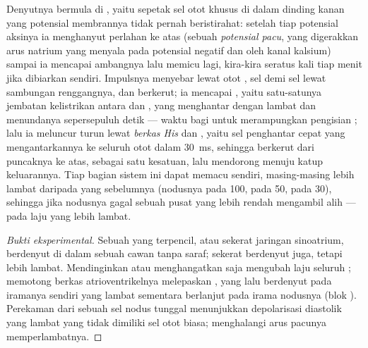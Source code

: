 \begin{proposition}\label{prop:b2:heart:conduction}
Denyutnya bermula di \emph{}, yaitu sepetak sel otot
khusus di dalam dinding  kanan yang potensial membrannya tidak
pernah beristirahat: setelah tiap potensial aksinya ia menghanyut
perlahan ke atas (sebuah \emph{potensial pacu}, yang digerakkan arus
natrium yang menyala pada potensial negatif dan oleh kanal kalsium)
sampai ia mencapai ambangnya lalu memicu lagi, kira-kira seratus kali
tiap menit jika dibiarkan sendiri. Impulsnya menyebar lewat otot
, sel demi sel lewat sambungan renggangnya, dan 
berkerut; ia mencapai \emph{}, yaitu satu-satunya
jembatan kelistrikan antara  dan , yang menghantar dengan
lambat dan menundanya sepersepuluh detik --- waktu bagi 
untuk merampungkan pengisian ; lalu ia meluncur turun lewat
\emph{berkas His} dan \emph{}, yaitu sel penghantar
cepat yang mengantarkannya ke seluruh otot  dalam
\qty{30}{ms}, sehingga  berkerut dari puncaknya ke atas,
sebagai satu kesatuan, lalu mendorong  menuju katup
keluarannya. Tiap bagian sistem ini dapat memacu sendiri, masing-masing
lebih lambat daripada yang sebelumnya (nodusnya pada 100,  pada 50,  pada 30), sehingga jika
nodusnya gagal sebuah pusat yang lebih rendah mengambil alih --- pada
laju yang lebih lambat.
\end{proposition}
\begin{proof}[Bukti eksperimental]
Sebuah  yang terpencil, atau sekerat jaringan sinoatrium,
berdenyut di dalam sebuah cawan tanpa saraf; sekerat  berdenyut
juga, tetapi lebih lambat. Mendinginkan atau menghangatkan  saja mengubah laju seluruh ; memotong berkas
atrioventrikelnya melepaskan , yang lalu berdenyut pada
iramanya sendiri yang lambat sementara  berlanjut pada irama
nodusnya (blok ). Perekaman dari sebuah sel nodus tunggal
menunjukkan depolarisasi diastolik yang lambat yang tidak dimiliki sel
otot biasa; menghalangi arus pacunya memperlambatnya.
\end{proof}

